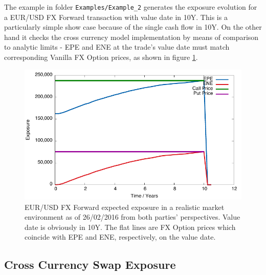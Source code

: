 \documentclass[12pt, a4paper]{article}
\begin{document}
The example in folder {\tt Examples/Example\_2} generates the exposure evolution for a EUR/USD FX Forward transaction with value date in 10Y. This is a particularly simple show case because of the single cash flow in 10Y. On the other hand it checks the cross currency model implementation by means of comparison to analytic limits - EPE and ENE at the trade's value date must match corresponding Vanilla FX Option prices, as shown in figure \ref{fig_5}.  
\begin{figure}[hbt]
\begin{center}
\includegraphics[scale=1.0]{example_fxforward.pdf}
\end{center}
\caption{EUR/USD FX Forward expected exposure in a realistic market environment as of 26/02/2016 from both parties' perspectives. Value date is obviously in 10Y. The flat lines are FX Option prices which coincide with EPE and ENE, respectively, on the value date.}
\label{fig_5}
\end{figure}

\subsection{Cross Currency Swap Exposure}
\end{document}
